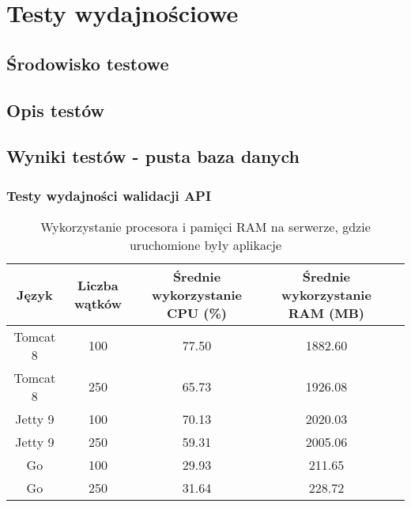 \chapter{Testy wydajnościowe}
\section{Środowisko testowe}
\section{Opis testów}
\section{Wyniki testów - pusta baza danych}

\newpage
\subsection{Testy wydajności walidacji API}
% 

\begin{table}[!htb]
\centering
\caption{Wykorzystanie procesora i pamięci RAM na serwerze, gdzie uruchomione były aplikacje}
\label{my-label}
\begin{tabular}{@{}ccccl@{}}
\toprule
\textbf{Język} & \textbf{Liczba wątków} & \multicolumn{1}{p{3cm}}{\textbf{Średnie wykorzystanie CPU (\%)}} & \multicolumn{1}{p{3cm}}{\textbf{Średnie wykorzystanie RAM (MB)}} &  \\ \midrule
Tomcat 8       & 100                    & 77.50                             & 1882.60                          &  \\
Tomcat 8       & 250                    & 65.73                            & 1926.08                          &  \\
Jetty 9        & 100                    & 70.13                            & 2020.03                          &  \\
Jetty 9        & 250                    & 59.31                            & 2005.06                          &  \\
Go             & 100                    & 29.93                            & 211.65                           &  \\
Go             & 250                    & 31.64                            & 228.72                           &  \\ \bottomrule
\end{tabular}
\end{table}

